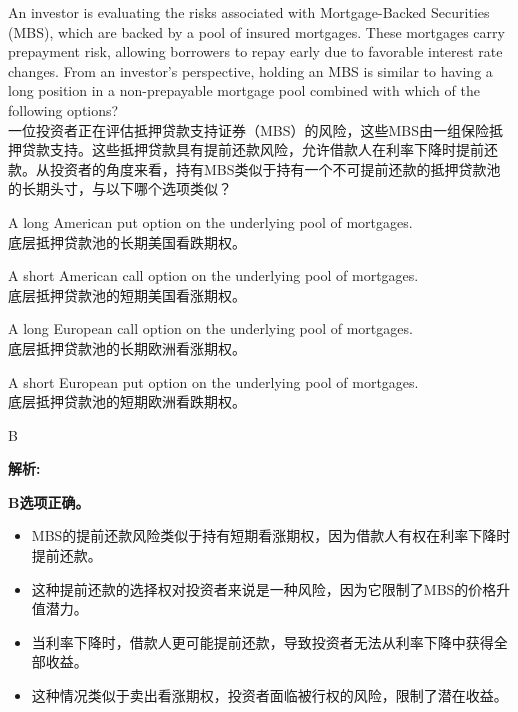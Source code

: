 \documentclass{article}
\newcounter{question} %
\newenvironment{explanation}
{\textbf{解析:}\par}
{\par}
\begin{document}
    \begin{question}
        An investor is evaluating the risks associated with Mortgage-Backed Securities (MBS), which are backed by a pool of insured mortgages. These mortgages carry prepayment risk, allowing borrowers to repay early due to favorable interest rate changes. From an investor's perspective, holding an MBS is similar to having a long position in a non-prepayable mortgage pool combined with which of the following options?
        \\一位投资者正在评估抵押贷款支持证券（MBS）的风险，这些MBS由一组保险抵押贷款支持。这些抵押贷款具有提前还款风险，允许借款人在利率下降时提前还款。从投资者的角度来看，持有MBS类似于持有一个不可提前还款的抵押贷款池的长期头寸，与以下哪个选项类似？
        \end{question}
        
        \begin{choices}
            \item A long American put option on the underlying pool of mortgages.\\
            底层抵押贷款池的长期美国看跌期权。
            \item A short American call option on the underlying pool of mortgages.\\
            底层抵押贷款池的短期美国看涨期权。
            \item A long European call option on the underlying pool of mortgages.\\
            底层抵押贷款池的长期欧洲看涨期权。
            \item A short European put option on the underlying pool of mortgages.
            \\底层抵押贷款池的短期欧洲看跌期权。
        \end{choices}
        
        \begin{correctanswer}
        B
        \end{correctanswer}
        
        \begin{explanation}
                \textbf{B选项正确。}
                \begin{itemize}
                    \item MBS的提前还款风险类似于持有短期看涨期权，因为借款人有权在利率下降时提前还款。
                    \item 这种提前还款的选择权对投资者来说是一种风险，因为它限制了MBS的价格升值潜力。
                    \item 当利率下降时，借款人更可能提前还款，导致投资者无法从利率下降中获得全部收益。
                    \item 这种情况类似于卖出看涨期权，投资者面临被行权的风险，限制了潜在收益。
                \end{itemize}
        
        \end{explanation}
        
\end{document}
